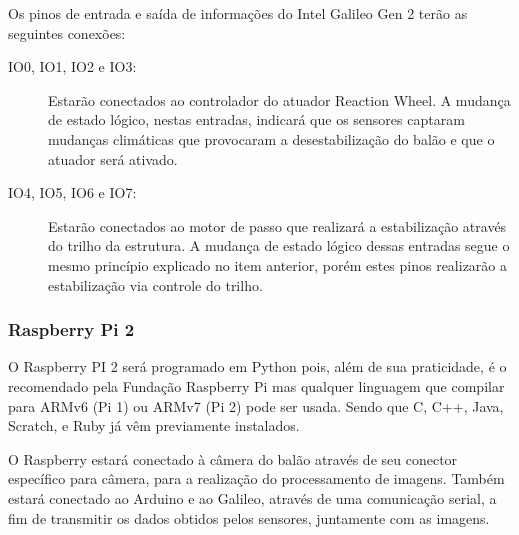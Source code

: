 		Os pinos de entrada e saída de informações do Intel Galileo Gen 2 terão as seguintes conexões:
		\begin{description}
			\item[IO0, IO1, IO2 e IO3:] Estarão conectados ao controlador do atuador Reaction Wheel. A mudança de estado lógico, nestas entradas, indicará que os sensores captaram mudanças climáticas que provocaram a desestabilização do balão e que o atuador será ativado.
			\item[IO4, IO5, IO6 e IO7:] Estarão conectados ao motor de passo que realizará a estabilização através do trilho da estrutura. A mudança de estado lógico dessas entradas segue o mesmo princípio explicado no item anterior, porém estes pinos realizarão a estabilização via controle do trilho.
		\end{description}

	\subsubsection{Raspberry Pi 2}

		O Raspberry PI 2 será programado em Python pois, além de sua praticidade, é o recomendado pela Fundação Raspberry Pi mas qualquer linguagem que compilar para ARMv6 (Pi 1) ou ARMv7 (Pi 2) pode ser usada. Sendo que C, C++, Java, Scratch, e Ruby já vêm previamente instalados.~\cite{raspberrypi}

		O Raspberry estará conectado à câmera do balão através de seu conector específico para câmera, para a realização do processamento de imagens. Também estará conectado ao Arduino e ao Galileo, através de uma comunicação serial, a fim de transmitir os dados obtidos pelos sensores, juntamente com as imagens.

